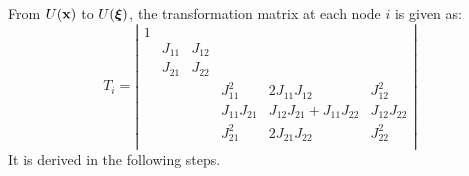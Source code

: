 \documentclass{report}
\newcommand{\bm}[1]{\mbox{\boldmath $#1$}}
\def\x{\mbox{\bf x}}
\begin{document}
From $U(\x)$ to $U(\bm{\xi})$, the transformation matrix at each node $i$ is given as:
$$
T_i =
\left|
\begin{array}{llllll}
1 &        &        &              &                             &              \\
  & J_{11} & J_{12} &              &                             &              \\
  & J_{21} & J_{22} &              &                             &              \\
  &        &        & J_{11}^2     & 2J_{11}J_{12}               & J_{12}^2     \\
  &        &        & J_{11}J_{21} & J_{12}J_{21} + J_{11}J_{22} & J_{12}J_{22} \\
  &        &        & J_{21}^2     & 2J_{21}J_{22}               & J_{22}^2     \\
\end{array}
\right|
$$
It is derived in the following steps.
\end{document}
